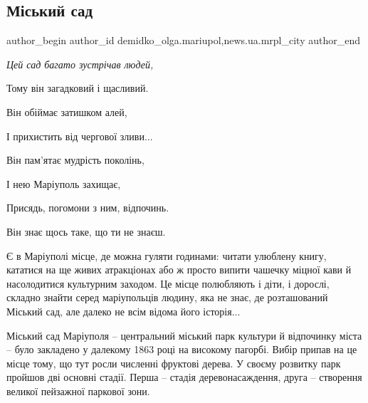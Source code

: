  
 
 
 
 
 
\subsection{Міський сад}
\label{sec:30_10_2017.stz.news.ua.mrpl_city.1.miskij_sad}
 
\ifcmt
 author_begin
   author_id demidko_olga.mariupol,news.ua.mrpl_city
 author_end
\fi

\vspace{0.5cm}
\begin{raggedright}
\em
Цей сад багато зустрічав людей,\par
Тому він загадковий і щасливий.\par
Він обіймає затишком алей,\par
І прихистить від чергової зливи...\par

Він пам'ятає мудрість поколінь,\par
І нею Маріуполь захищає,\par
Присядь, погомони з ним, відпочинь.\par
Він знає щось таке, що ти не знаєш.\par
\end{raggedright}
\vspace{0.5cm}

Є в Маріуполі місце, де можна гуляти годинами: читати улюблену книгу, кататися
на ще живих атракціонах або ж просто випити чашечку міцної кави й насолодитися
культурним заходом. Це місце полюбляють і діти, і дорослі, складно знайти серед
маріупольців людину, яка не знає, де розташований Міський сад, але далеко не
всім відома його історія... 

Міський сад Маріуполя – центральний міський парк культури й відпочинку міста –
було закладено у далекому 1863 році на високому пагорбі. Вибір припав на це
місце тому, що тут росли численні фруктові дерева. У своєму розвитку парк
пройшов дві основні стадії. Перша – стадія деревонасаждення, друга – створення
великої пейзажної паркової зони.

